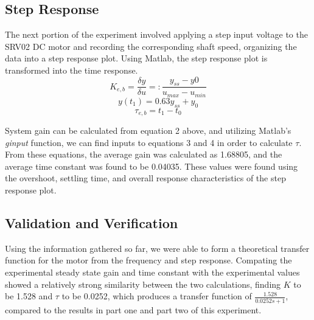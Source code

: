 \documentclass[conference,compsoc]{IEEEtran}
\begin{document}
\subsection{Step Response}

The next portion of the experiment involved applying a step input voltage to the SRV02 DC motor and recording the corresponding shaft speed, organizing the data into a step response plot. Using Matlab, the step response plot is transformed into the time response.
\begin{equation}
  K_{e,b}=\frac{\delta y}{\delta u}=:\frac{y_{ss}-y{0}}{u_{max}-u_{min}}
\end{equation}
\begin{equation}
  y(t_{1})=0.63y_{ss}+y_{0}
\end{equation}
\begin{equation}
  \tau_{e,b}=t_{1}-t_{0}
\end{equation}

System gain can be calculated from equation 2 above, and utilizing Matlab's \textit{ginput} function, we can find inputs to equations 3 and 4 in order to calculate $\tau$.
From these equations, the average gain was calculated as 1.68805, and the average time constant was found to be 0.04035. These values were found using the overshoot, settling time, and overall response characteristics of the step response plot.

\subsection{Validation and Verification}
Using the information gathered so far, we were able to form a theoretical transfer function for the motor from the frequency and step response. Compating the experimental steady state gain and time constant with the experimental values showed a relatively strong similarity between the two calculations, finding $K$ to be 1.528 and $\tau$ to be 0.0252, which produces a transfer function of $\frac{1.528}{0.0252s+1}$, compared to the results in part one and part two of this experiment.
\end{document}
